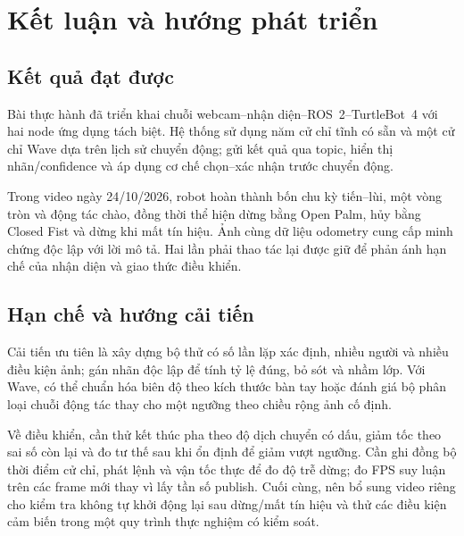 \documentclass[12pt,a4paper]{article}
\begin{document}
\section{Kết luận và hướng phát triển}
\subsection{Kết quả đạt được}
Bài thực hành đã triển khai chuỗi webcam--nhận diện--ROS~2--TurtleBot~4 với hai node ứng dụng tách biệt. Hệ thống sử dụng năm cử chỉ tĩnh có sẵn và một cử chỉ Wave dựa trên lịch sử chuyển động; gửi kết quả qua topic, hiển thị nhãn/confidence và áp dụng cơ chế chọn--xác nhận trước chuyển động.

Trong video ngày 24/10/2026, robot hoàn thành bốn chu kỳ tiến--lùi, một vòng tròn và động tác chào, đồng thời thể hiện dừng bằng Open Palm, hủy bằng Closed Fist và dừng khi mất tín hiệu. Ảnh cùng dữ liệu odometry cung cấp minh chứng độc lập với lời mô tả. Hai lần phải thao tác lại được giữ để phản ánh hạn chế của nhận diện và giao thức điều khiển.

\subsection{Hạn chế và hướng cải tiến}
Cải tiến ưu tiên là xây dựng bộ thử có số lần lặp xác định, nhiều người và nhiều điều kiện ảnh; gán nhãn độc lập để tính tỷ lệ đúng, bỏ sót và nhầm lớp. Với Wave, có thể chuẩn hóa biên độ theo kích thước bàn tay hoặc đánh giá bộ phân loại chuỗi động tác thay cho một ngưỡng theo chiều rộng ảnh cố định.

Về điều khiển, cần thử kết thúc pha theo độ dịch chuyển có dấu, giảm tốc theo sai số còn lại và đo tư thế sau khi ổn định để giảm vượt ngưỡng. Cần ghi đồng bộ thời điểm cử chỉ, phát lệnh và vận tốc thực để đo độ trễ dừng; đo FPS suy luận trên các frame mới thay vì lấy tần số publish. Cuối cùng, nên bổ sung video riêng cho kiểm tra không tự khởi động lại sau dừng/mất tín hiệu và thử các điều kiện cảm biến trong một quy trình thực nghiệm có kiểm soát.
\end{document}

